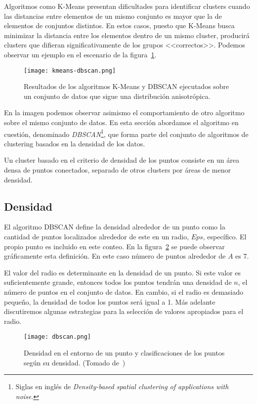 Algoritmos como K-Means presentan dificultades para identificar clusters cuando las distancias entre elementos de un mismo conjunto es mayor que la de elementos de conjuntos distintos.
En estos casos, puesto que K-Means busca minimizar la distancia entre los elementos dentro de un mismo cluster, producirá clusters que difieran significativamente de los grupos <<correctos>>.
Podemos observar un ejemplo en el escenario de la figura~\ref{img:kmeans-dbscan}.

\begin{figure}[!h]
    \centering
    \texttt{[image: kmeans-dbscan.png]}
    \caption{Resultados de los algoritmos K-Means y DBSCAN ejecutados sobre un conjunto de datos que sigue una distribución anisotrópica.}
    \label{img:kmeans-dbscan}
\end{figure}

En la imagen podemos observar asimismo el comportamiento de otro algoritmo sobre el mismo conjunto de datos.
En esta sección abordamos el algoritmo en cuestión, denominado \textit{DBSCAN}\footnote{Siglas en inglés de \textit{Density-based spatial clustering of applications with noise}.}, que forma parte del conjunto de algoritmos de clustering basados en la densidad de los datos.

Un cluster basado en el criterio de densidad de los puntos consiste en un área densa de puntos conectados, separado de otros clusters por áreas de menor densidad.

\subsection{Densidad}\label{subsec:densidad}

El algoritmo DBSCAN define la densidad alrededor de un punto como la cantidad de puntos localizados alrededor de este en un radio, $Eps$, específico.
El propio punto es incluido en este conteo.
En la figura~\ref{img:dbscan} se puede observar gráficamente esta definición.
En este caso número de puntos alrededor de $A$ es 7.

El valor del radio es determinante en la densidad de un punto.
Si este valor es suficientemente grande, entonces todos los puntos tendrán una densidad de $n$, el número de puntos en el conjunto de datos.
En cambio, si el radio es demasiado pequeño, la densidad de todos los puntos será igual a 1.
Más adelante discutiremos algunas estrategias para la selección de valores apropiados para el radio.

\begin{figure}[!h]
    \centering
    \texttt{[image: dbscan.png]}
    \caption{Densidad en el entorno de un punto y clasificaciones de los puntos según su densidad. (Tomado de~\cite{Tan05})}
    \label{img:dbscan}
\end{figure}

